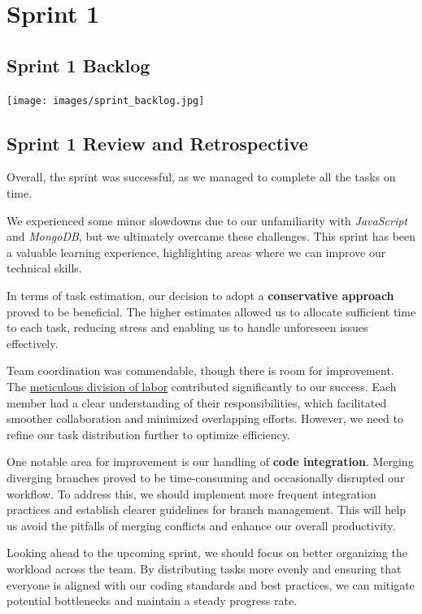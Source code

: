 \documentclass{article}
\begin{document}
\section{Sprint 1}

\subsection{Sprint 1 Backlog}
\texttt{[image: images/sprint\_backlog.jpg]}

\subsection{Sprint 1 Review and Retrospective}

Overall, the sprint was successful, as we managed to complete all the tasks on time.

We experienced some minor slowdowns due to our unfamiliarity with \textit{JavaScript} and \textit{MongoDB}, but we ultimately overcame these challenges. This sprint has been a valuable learning experience, highlighting areas where we can improve our technical skills.

In terms of task estimation, our decision to adopt a \textbf{conservative approach} proved to be beneficial. The higher estimates allowed us to allocate sufficient time to each task, reducing stress and enabling us to handle unforeseen issues effectively.

Team coordination was commendable, though there is room for improvement. The \underline{meticulous division of labor} contributed significantly to our success. Each member had a clear understanding of their responsibilities, which facilitated smoother collaboration and minimized overlapping efforts. However, we need to refine our task distribution further to optimize efficiency.

One notable area for improvement is our handling of \textbf{code integration}. Merging diverging branches proved to be time-consuming and occasionally disrupted our workflow. To address this, we should implement more frequent integration practices and establish clearer guidelines for branch management. This will help us avoid the pitfalls of merging conflicts and enhance our overall productivity.

Looking ahead to the upcoming sprint, we should focus on better organizing the workload across the team. By distributing tasks more evenly and ensuring that everyone is aligned with our coding standards and best practices, we can mitigate potential bottlenecks and maintain a steady progress rate.
\end{document}
